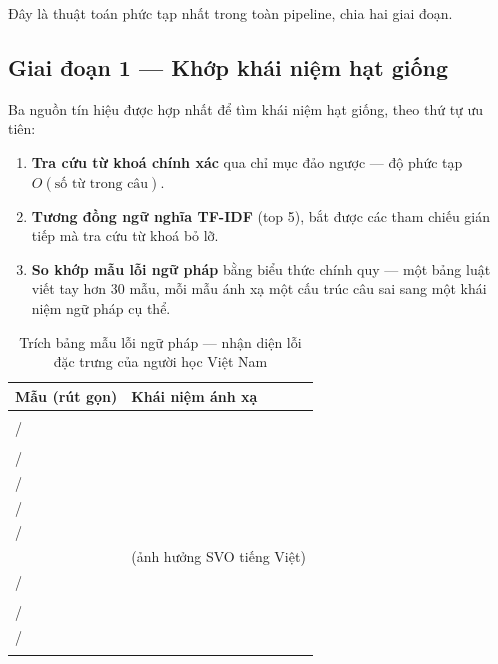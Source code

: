 Đây là thuật toán phức tạp nhất trong toàn pipeline, chia hai giai đoạn.

\subsection{Giai đoạn 1 — Khớp khái niệm hạt giống}

Ba nguồn tín hiệu được hợp nhất để tìm khái niệm hạt giống, theo thứ tự ưu tiên:

\begin{enumerate}[leftmargin=1.4em]
  \item \textbf{Tra cứu từ khoá chính xác} qua chỉ mục đảo ngược — độ phức tạp
  \(O(\text{số từ trong câu})\).
  \item \textbf{Tương đồng ngữ nghĩa TF-IDF} (top 5), bắt được các tham chiếu gián tiếp
  mà tra cứu từ khoá bỏ lỡ.
  \item \textbf{So khớp mẫu lỗi ngữ pháp} bằng biểu thức chính quy — một bảng luật viết tay
  hơn 30 mẫu, mỗi mẫu ánh xạ một cấu trúc câu sai sang một khái niệm ngữ pháp cụ thể.
\end{enumerate}

\begin{longtable}{L{5.4cm} L{6.4cm}}
\toprule
\textbf{Mẫu (rút gọn)} & \textbf{Khái niệm ánh xạ}\\
\midrule
\endhead
{} & \\
 /  & \\
 & \\
 /  & \\
 /  & \\
 /  & \\
 /  & \\
 &  (ảnh hưởng SVO tiếng Việt)\\
 /  & \\
 & \\
 /  & \\
 /  & \\
\bottomrule
\caption{Trích bảng mẫu lỗi ngữ pháp — nhận diện lỗi đặc trưng của người học Việt Nam}
\label{tbl:grammar-patterns}
\end{longtable}

